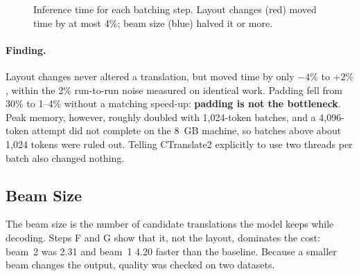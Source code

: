 \begin{figure}[H]
\centering
{}
\caption[Inference time per batching step]{Inference time for each batching step. Layout changes (red) moved time by at
most 4\%; beam size (blue) halved it or more.}
\label{fig:layout}
\end{figure}

\paragraph{Finding.} Layout changes never altered a translation, but moved time by only $-4\%$ to $+2\%$, within the
2\% run-to-run noise measured on identical work. Padding fell from 30\% to 1--4\% without a matching speed-up:
\textbf{padding is not the bottleneck}. Peak memory, however, roughly doubled with 1,024-token batches, and a 4,096-token
attempt did not complete on the 8~GB machine, so batches above about 1,024 tokens were ruled out. Telling CTranslate2
explicitly to use two threads per batch also changed nothing.

\subsection{Beam Size}
The beam size is the number of candidate translations the model keeps while decoding. Steps F and G show that it, not
the layout, dominates the cost: beam~2 was 2.31\x{} and beam~1 4.20\x{} faster than the baseline. Because a smaller
beam changes the output, quality was checked on two datasets.


